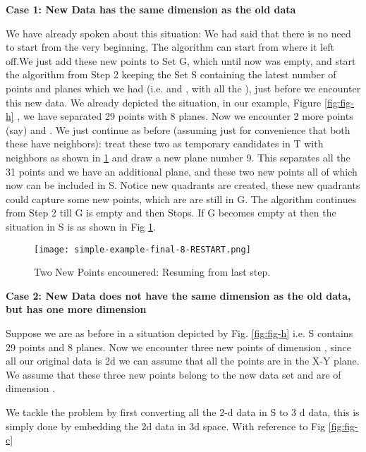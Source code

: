 \documentclass[english]{article}
\begin{document}
\textbf{Case 1: New Data has the same dimension as the old data} 

We have already spoken about this situation: We had said that there is no need to start from the very beginning, The algorithm can start from where it left off.We just add these new points to Set G, which until now was empty, and start the algorithm from Step 2 keeping the Set S containing the latest number of points and planes which we had (i.e.  and , with all the ), just before we encounter this new data. We already depicted the situation, in our example, Figure \ref{fig:fig-h} , we have separated 29 points with 8 planes. Now we encounter 2 more points (say)  and . We just continue as before (assuming just for convenience that both these have neighbors): treat these two as temporary candidates in T with neighbors as shown in \ref{fig:fig-j} and draw a new plane number 9. This separates all the 31 points and  we have an additional plane, and these two new points all of which now can be included in S. Notice new quadrants are created, these new quadrants could capture some new points,  which are are still in G. The algorithm continues from Step 2 till G is empty and then Stops. If G becomes empty at  then the situation in S is as shown in Fig \ref{fig:fig-j}.



\medskip{}
\medskip{}
\begin{figure}[htp]
 \begin{center}
\texttt{[image: simple-example-final-8-RESTART.png]}

\caption{Two New Points encounered: Resuming from last step.}

\label{fig:fig-j} \end{center}
\end{figure} 

\medskip{}

\textbf{Case 2: New Data does not have the same dimension as the old data, but has one more dimension } 

Suppose we are as before in a situation depicted by Fig. \ref{fig:fig-h} i.e. S contains 29 points and 8 planes. Now we encounter three new points of dimension , since all  our original data is 2d we can assume that all the points are in the X-Y plane. We assume that these three new points belong to the new data set and are of dimension . 

We tackle the problem by first converting all the 2-d data in S to 3 d data, this is simply done by embedding the 2d data in 3d space. With reference to Fig \ref{fig:fig-c}
\end{document}
